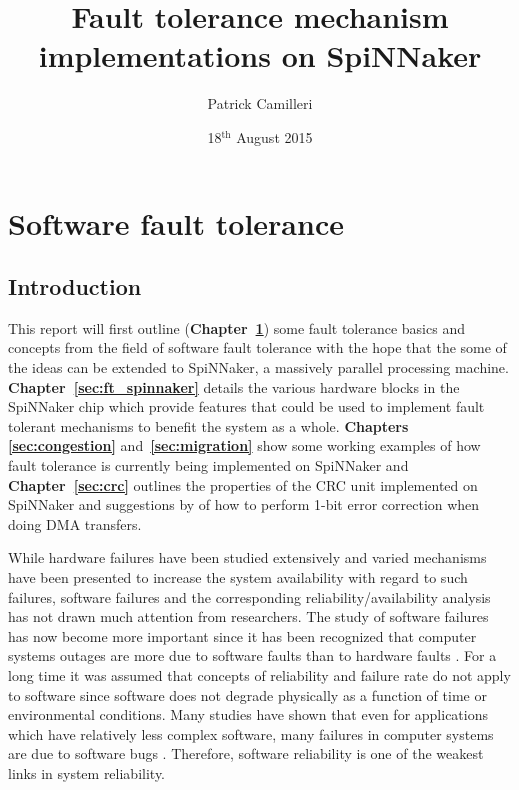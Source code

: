 \documentclass[oneside, a4paper, 11pt]{memoir}
\title{Fault tolerance mechanism implementations on SpiNNaker}
\author{Patrick Camilleri}
\date{18$^\text{th}$ August 2015}
\makeatletter
\newlength\drop
\newcommand*{\titleGM}{%
	\thispagestyle{empty}
	\begingroup%
	\drop = 0.1\textheight
	\vspace*{\baselineskip}
	\vfill
	\hbox{%
		  \hspace*{0.1\textwidth}%
		  \rule{1pt}{\dimexpr\textheight-28pt\relax}%
		  \hspace*{0.05\textwidth}%
		  \parbox[b]{0.75\textwidth}{%
			    \vbox{%
				      \vspace{\drop}
				      {\Huge\bfseries\raggedright\@title\par}\vskip2.37\baselineskip
				      {\Large\itshape PRiME Project}\\[4\baselineskip]
				      {\Large\bfseries\@author}\\[2\baselineskip]
				      {\large\@date\par}
				      \vspace{0.5\textheight}
				    }%
			  }%
		}%
	\vfill
	\endgroup}
\makeatother
\begin{document}
	
\begin{titlingpage}
\titleGM
\end{titlingpage}

\frontmatter
\tableofcontents

\mainmatter
{}

\chapter{Software fault tolerance}
\label{sec:software_ft}

\section{Introduction}
This report will first outline (\textbf{Chapter~\ref{sec:software_ft}}) some fault tolerance basics and concepts from the field of software fault tolerance \citep{trivedi2008software} with the hope that the some of the ideas can be extended to SpiNNaker, a massively parallel processing machine. \textbf{Chapter~\ref{sec:ft_spinnaker}} details the various hardware blocks in the SpiNNaker chip which provide features that could be used to implement fault tolerant mechanisms to benefit the system as a whole. \textbf{Chapters \ref{sec:congestion}} and~\textbf{\ref{sec:migration}} show some working examples of how fault tolerance is currently being implemented on SpiNNaker and \textbf{Chapter~\ref{sec:crc}} outlines the properties of the CRC unit implemented on SpiNNaker and suggestions by \citet{grymel2013error} of how to perform 1-bit error correction when doing DMA transfers.

While hardware failures have been studied extensively and varied mechanisms have been presented to increase the system availability with regard to such failures, software failures and the corresponding reliability/availability analysis has not drawn much attention from researchers. The study of software failures has now become more important since it has been recognized that computer systems outages are more due to software faults than to hardware faults \citep{gray1991high}. For a long time it was assumed that concepts of reliability and failure rate do not apply to software since software does not degrade physically as a function of time or environmental conditions. Many studies have shown that even for applications which have relatively less complex software, many failures in computer systems are due to software bugs \citep{pradhan1996fault}. Therefore, software reliability is one of the weakest links in system reliability.
\end{document}
